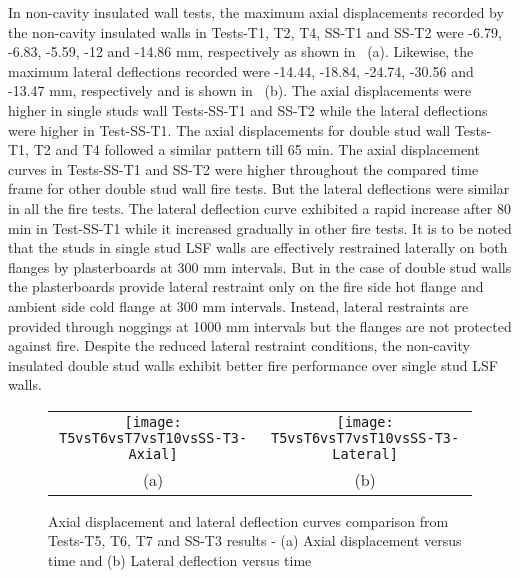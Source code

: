 In non-cavity insulated wall tests, the maximum axial displacements recorded by the non-cavity insulated walls in Tests-T1, T2, T4, SS-T1 and SS-T2 were -6.79, -6.83, -5.59, -12 and -14.86 mm, respectively as shown in ~(a). Likewise, the maximum lateral deflections recorded were -14.44, -18.84, -24.74, -30.56 and -13.47 mm, respectively and is shown in ~(b). The axial displacements were higher in single studs wall Tests-SS-T1 and SS-T2 while the lateral deflections were higher in Test-SS-T1. The axial displacements for double stud wall Tests-T1, T2 and T4 followed a similar pattern till 65 min. The axial displacement curves in Tests-SS-T1 and SS-T2 were higher throughout the compared time frame for other double stud wall fire tests. But the lateral deflections were similar in all the fire tests. The lateral deflection curve exhibited a rapid increase after 80 min in Test-SS-T1 while it increased gradually in other fire tests. It is to be noted that the studs in single stud LSF walls are effectively restrained laterally on both flanges by plasterboards at 300 mm intervals. But in the case of double stud walls the plasterboards provide lateral restraint only on the fire side hot flange and ambient side cold flange at 300 mm intervals. Instead, lateral restraints are provided through noggings at 1000 mm intervals but the flanges are not protected against fire. Despite the reduced lateral restraint conditions, the non-cavity insulated double stud walls exhibit better fire performance over single stud LSF walls.
\begin{figure}[!htbp]
	\centering
		\begin{tabular}{cc}
			\texttt{[image: T5vsT6vsT7vsT10vsSS-T3-Axial]} & \texttt{[image: T5vsT6vsT7vsT10vsSS-T3-Lateral]} \\ 
			(a) & (b)  \\ 
		\end{tabular} 
		\caption{Axial displacement and lateral deflection curves comparison from Tests-T5, T6, T7 and SS-T3 results - (a) Axial displacement versus time and (b) Lateral deflection versus time}
		\label{fig:T5vsT6vsT7vsT10vsSS-T3-Displacement}
\end{figure}

